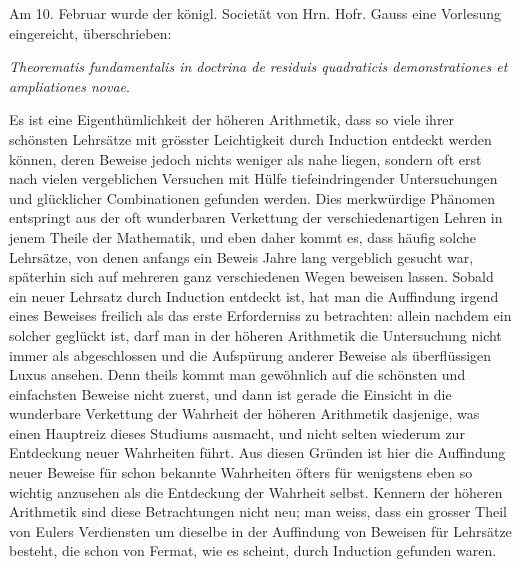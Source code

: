 \documentclass[12pt]{article}
\begin{document}
Am 10. Februar wurde der königl. Societät von Hrn. Hofr. Gauss eine Vorlesung eingereicht, überschrieben:
\begin{center}\textit{Theorematis fundamentalis in doctrina de residuis quadraticis demonstrationes et ampliationes novae}.\end{center}
Es ist eine Eigenthümlichkeit der höheren Arithmetik, dass so viele ihrer schönsten Lehrsätze mit grösster Leichtigkeit durch Induction entdeckt werden können, deren Beweise jedoch nichts weniger als nahe liegen, sondern oft erst nach vielen vergeblichen Versuchen mit Hülfe tiefeindringender Untersuchungen und glücklicher Combinationen gefunden werden. Dies merkwürdige Phänomen entspringt aus der oft wunderbaren Verkettung der verschiedenartigen Lehren in jenem Theile der Mathematik, und eben daher kommt es, dass häufig solche Lehrsätze, von denen anfangs ein Beweis Jahre lang vergeblich gesucht war, späterhin sich auf mehreren ganz verschiedenen Wegen beweisen lassen. Sobald ein neuer Lehrsatz durch Induction entdeckt ist, hat man die Auffindung irgend eines Beweises freilich als das erste Erforderniss zu betrachten: allein nachdem ein solcher geglückt ist, darf man in der höheren Arithmetik die Untersuchung nicht immer als abgeschlossen und die Aufspürung anderer Beweise als überflüssigen Luxus ansehen. Denn theils kommt man gewöhnlich auf die schönsten und einfachsten Beweise nicht zuerst, und dann ist gerade die Einsicht in die wunderbare Verkettung der Wahrheit der höheren Arithmetik dasjenige, was einen Hauptreiz dieses Studiums ausmacht, und nicht selten wiederum zur Entdeckung neuer Wahrheiten führt. Aus diesen Gründen ist hier die Auffindung neuer Beweise für schon bekannte Wahrheiten öfters für wenigstens eben so wichtig anzusehen als die Entdeckung der Wahrheit selbst. Kennern der höheren Arithmetik sind diese Betrachtungen nicht neu; man weiss, dass ein grosser Theil von Eulers Verdiensten um dieselbe in der Auffindung von Beweisen für Lehrsätze besteht, die schon von Fermat, wie es scheint, durch Induction gefunden waren.
\end{document}
